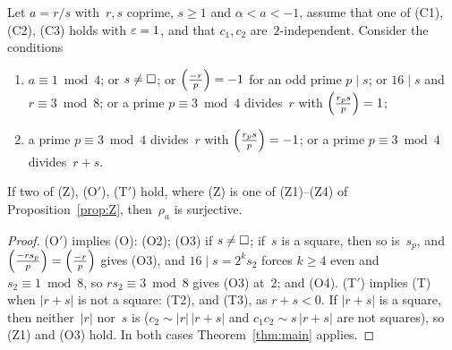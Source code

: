 \begin{corollary}
  \label{cor:interval}
  \leanok
  Let $a = r/s$ with~$r, s$ coprime, $s \ge 1$ and $\alpha < a < -1$, assume that one of (C1),
  (C2), (C3) holds with $\varepsilon = 1$, and that $c_1, c_2$ are~$2$-independent. Consider the
  conditions
  \begin{enumerate}
    \item[(O$'$)] $a \equiv 1 \bmod 4$; or $s \ne \square$; or $\left(\frac{-r}{p}\right) = -1$ for an odd prime
          $p \mid s$; or $16 \mid s$ and $r \equiv 3 \bmod 8$; or a prime $p \equiv 3 \bmod 4$
          divides~$r$ with $\left(\frac{r_p s}{p}\right) = 1$;
    \item[(T$'$)] a prime $p \equiv 3 \bmod 4$ divides~$r$ with $\left(\frac{r_p s}{p}\right) = -1$; or a prime
          $p \equiv 3 \bmod 4$ divides~$r + s$.
  \end{enumerate}
  If two of (Z), (O$'$), (T$'$) hold, where (Z) is one of (Z1)--(Z4) of
  Proposition~\ref{prop:Z}, then~$\rho_a$ is surjective.
\end{corollary}
\begin{proof}
  \leanok
  (O$'$) implies (O): (O2); (O3) if $s \ne \square$; if~$s$ is a square, then so is~$s_p$,
  and $\left(\frac{-r s_p}{p}\right) = \left(\frac{-r}{p}\right)$ gives (O3), and $16 \mid s = 2^k s_2$ forces $k \ge 4$ even
  and $s_2 \equiv 1 \bmod 8$, so $r s_2 \equiv 3 \bmod 8$ gives (O3) at~$2$; and (O4). (T$'$) implies
  (T) when $|r + s|$ is not a square: (T2), and (T3), as $r + s < 0$. If $|r + s|$ is a square,
  then neither~$|r|$ nor~$s$ is ($c_2 \sim |r|\,|r + s|$ and $c_1 c_2 \sim s\,|r + s|$ are not
  squares), so (Z1) and (O3) hold. In both cases Theorem~\ref{thm:main} applies.
\end{proof}

